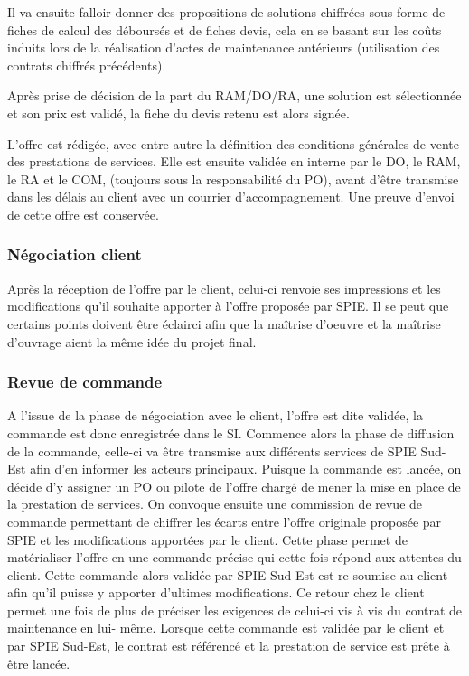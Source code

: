 Il va ensuite falloir donner des propositions de solutions chiffrées sous forme de fiches de calcul des déboursés et de fiches devis, cela en se basant sur les coûts induits lors de la réalisation d'actes de maintenance antérieurs (utilisation des contrats chiffrés précédents).

Après prise de décision de la part du RAM/DO/RA, une solution est sélectionnée et son prix est validé, la fiche du devis retenu est alors signée.

L’offre est rédigée, avec entre autre la définition des conditions générales de vente des prestations de services. Elle est ensuite validée en interne par le DO, le RAM, le RA et le COM, (toujours sous la responsabilité du PO), avant d’être transmise dans les délais au client avec un courrier d’accompagnement. Une preuve d’envoi de cette offre est conservée.

\subsubsection{Négociation client}

Après la réception de l’offre par le client, celui-ci renvoie ses impressions et les modifications qu’il souhaite apporter à l’offre proposée par SPIE. Il se peut que certains points doivent être éclairci afin que la maîtrise d’oeuvre et la maîtrise d’ouvrage aient la même idée du projet final.

\subsubsection{Revue de commande}

A l’issue de la phase de négociation avec le client, l’offre est dite validée, la commande est donc enregistrée dans le SI. Commence alors la phase de diffusion de la commande, celle-ci va être transmise aux différents services de SPIE Sud-Est afin d’en informer les acteurs principaux. Puisque la commande est lancée, on décide d’y assigner un PO ou pilote de l’offre chargé de mener la mise en place de la prestation de services. On convoque ensuite une commission de revue de commande permettant de chiffrer les écarts entre l’offre originale proposée par SPIE et les modifications apportées par le client. Cette phase permet de matérialiser l’offre en une commande précise qui cette fois répond aux attentes du client. Cette commande alors validée par SPIE Sud-Est est re-soumise au client afin qu’il puisse y apporter d’ultimes modifications. Ce retour chez le client permet une fois de plus de préciser les exigences de celui-ci vis à vis du contrat de maintenance en lui- même. Lorsque cette commande est validée par le client et par SPIE Sud-Est, le contrat est référencé et la prestation de service est prête à être lancée.

